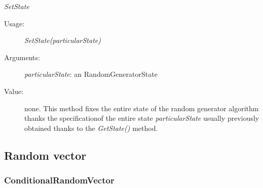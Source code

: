 \begin{description}
\begin{description}
\item \textit{SetState}
\begin{description}
\item[Usage:] \textit{SetState(particularState)}
\item[Arguments:] \textit{particularState}: an RandomGeneratorState
\item[Value:] none. This method fixes the entire state of the random generator algorithm thanks the specificationof the entire state \textit{particularState} usually previously obtained thanks to the {\itshape GetState()} method.
\end{description}
\bigskip

\end{description}

\end{description}


\newpage
\subsection{Random vector}

\subsubsection{ConditionalRandomVector}

